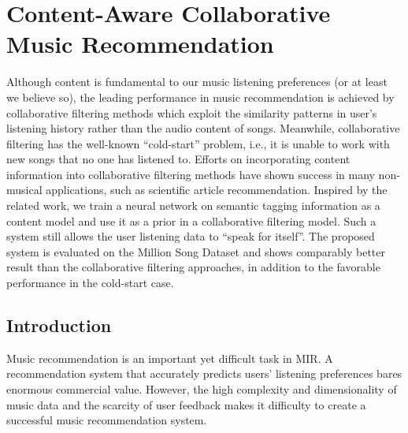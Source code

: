 

\chapter{Content-Aware Collaborative Music Recommendation}\label{chpt:content}


Although content is fundamental to our music listening preferences (or at least we believe so), the leading performance in music recommendation is achieved by collaborative filtering methods which exploit the similarity patterns in user's listening history rather than the audio content of songs. Meanwhile, collaborative filtering has the well-known ``cold-start'' problem, i.e., it is unable to work with new songs that no one has listened to.  Efforts on incorporating content information into collaborative filtering methods have shown success in many non-musical applications, such as scientific article recommendation. Inspired by the related work, we train a neural network on semantic tagging information as a content model and use it as a prior in a collaborative filtering model. Such a system still allows the user listening data to ``speak for itself''. The proposed system is evaluated on the Million Song Dataset and shows comparably better result than the collaborative filtering approaches, in addition to the favorable performance in the cold-start case. 

%
\section{Introduction}\label{chpt:content:sec:intro}
Music recommendation is an important yet difficult task in \gls{MIR}. A recommendation system that accurately predicts users' listening preferences bares enormous commercial value. However, the high complexity and dimensionality of music data and the scarcity of user feedback makes it difficulty to create a successful music recommendation system. 

